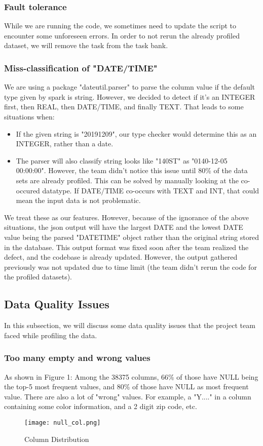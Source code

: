 \documentclass[sigconf]{acmart}
\begin{document}
\subsubsection{Fault tolerance}
While we are running the code, we sometimes need to update the script to encounter some unforeseen errors. In order to not rerun the already profiled dataset, we will remove the task from the task bank.
\subsubsection{Miss-classification of "DATE/TIME"}
We are using a package "dateutil.parser" to parse the column value if the default type given by spark is string. However, we decided to detect if it's an INTEGER first, then REAL, then DATE/TIME, and finally TEXT. That leads to some situations when:
\begin{itemize}
    \item If the given string is "20191209", our type checker would determine this as an INTEGER, rather than a date.
    \item The parser will also classify string looks like "140ST" as "0140-12-05 00:00:00". However, the team didn't notice this issue until 80\% of the data sets are already profiled. This can be solved by manually looking at the co-occured datatype. If DATE/TIME co-occurs with TEXT and INT, that could mean the input data is not problematic.
\end{itemize}
We treat these as our features. However, because of the ignorance of the above situations, the json output will have the largest DATE and the lowest DATE value being the parsed "DATETIME" object rather than the original string stored in the database. This output format was fixed soon after the team realized the defect, and the codebase is already updated. However, the output gathered previously was not updated due to time limit (the team didn't rerun the code for the profiled datasets).
\subsection{Data Quality Issues}
In this subsection, we will discuss some data quality issues that the project team faced while profiling the data.
\subsubsection{Too many empty and wrong values} As shown in Figure 1: Among the 38375 columns, 66\% of those have NULL being the top-5 most frequent values, and 80\% of those have NULL as most frequent value. There are also a lot of "wrong" values. For example, a "Y...." in a column containing some color information, and a 2 digit zip code, etc.
\begin{figure}[htp]
    \centering
    \texttt{[image: null\_col.png]}
    \caption{Column Distribution}
    \label{fig:galaxy}
\end{figure}
\end{document}
